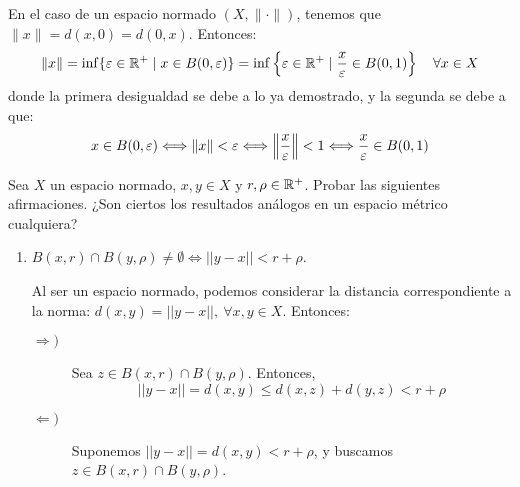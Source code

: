 \begin{ejercicio}
    \noindent
    En el caso de un espacio normado $(X, \|\cdot \|)$, tenemos que $\|x\|=d(x,0)=d(0,x)$. Entonces:
    \begin{equation*}
        \|x\|=\inf \{\varepsilon\in \mathbb{R}^+\mid x\in B(0,\varepsilon)\}=\inf \left\{\varepsilon\in \mathbb{R}^+\mid \frac{x}{\varepsilon}\in B(0,1)\right\}    \quad \forall x\in X
    \end{equation*}
    donde la primera desigualdad se debe a lo ya demostrado, y la segunda se debe a que:
    \begin{equation*}
        x\in B(0,\varepsilon)\Longleftrightarrow \|x\|<\varepsilon \Longleftrightarrow \left\|\frac{x}{\varepsilon}\right\|<1 \Longleftrightarrow \frac{x}{\varepsilon}\in B(0,1)
    \end{equation*}
\end{ejercicio}


\begin{ejercicio}\label{Ej:Tema2_2}
    Sea $X$ un espacio normado, $x,y\in X$ y $r,\rho\in \mathbb{R}^+$. Probar las siguientes afirmaciones. ¿Son ciertos los resultados análogos en un espacio métrico cualquiera?
    \begin{enumerate}
        \item $B(x,r)\cap B(y,\rho)\neq \emptyset \Longleftrightarrow ||y-x|| <r+\rho$. \label{Ej:Tema2_2.1}

        Al ser un espacio normado, podemos considerar la distancia correspondiente a la norma: $d(x,y)=||y-x||,~\forall x,y\in X$. Entonces:
        \begin{description}
            \item[$\Longrightarrow)$]
            Sea $z\in B(x,r)\cap B(y,\rho)$. Entonces,
            \begin{equation*}
                ||y-x|| = d(x,y) \leq d(x,z)+ d(y,z)<r + \rho
            \end{equation*}

            \item[$\Longleftarrow)$]
            Suponemos $||y-x||=d(x,y)<r+\rho$, y buscamos $z\in B(x,r)\cap B(y,\rho)$.\\

            \begin{comment}
            Supongamos en primer lugar que $d(x,z)+d(y,z)\geq r+\rho,~\forall z\in X$. Entonces, tomando en particular $z=y$, tenemos que
            \begin{equation*}
                d(x,z)+\cancelto{0}{d(y,z)}=d(x,y)\geq r+\rho \quad \text{Contradicción.}
            \end{equation*}


\end{comment}
\end{description}
\end{enumerate}
\end{ejercicio}
